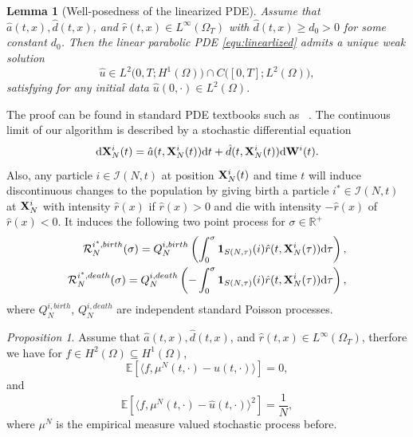 \documentclass[preprint,12pt]{elsarticle}
\newtheorem{lemma}[theorem]{Lemma}
\theoremstyle{definition}
\theoremstyle{remark}
\newtheorem{proposition}{Proposition}
\begin{document}
\begin{lemma}[Well-posedness of the linearized PDE]\label{lemma:well_posedness}
Assume that $\hat a(t,x), \hat d(t,x)$,  and  $ \hat r(t,x) \in L^\infty(\Omega_T)$ with 
$\hat d(t,x) \ge d_0 > 0$ for some constant $d_0$. 
Then the linear parabolic PDE \eqref{equ:linearlized}
admits a unique weak solution 
\[
\hat u \in L^2\big(0,T; H^1(\Omega)\big) \cap C\big([0,T]; L^2(\Omega)\big),
\]
satisfying 
for any initial data $\hat u(0,\cdot) \in L^2(\Omega)$.
\end{lemma}
The proof can be found in standard PDE textbooks such as ~\cite{evans2022partial}.
The continuous limit of our algorithm is described by a stochastic differential equation
\[
\mathrm{d} \mathbf{X}^i_N(t) = \hat a(t,\mathbf{X}^i_N(t))\mathrm{d} t  + \hat d (t,\mathbf{X}^i_N(t)) \mathrm{d} \mathbf{W}^i(t).
\]
Also, any particle $i\in \mathcal I(N,t)$ at position $\mathbf{X}^i_N(t)$ and time $t$ will induce discontinuous changes to the population by giving birth a particle $i^*\in \mathcal I(N,t)$ at $\mathbf{X}^i_N$ with intensity $\hat r(x)$ if $\hat r(x)>0$ and die with intensity $-\hat r(x)$ of $\hat r(x)<0$. It induces the following two point process for $\sigma\in \mathbb R^+$ 
\[
\begin{aligned}
   \mathcal R^{i^*,birth}_N( \sigma) = Q^{i,birth}_N \left(\int_{0}^{ \sigma} \mathbf 1 _{S(N,\tau)}(i)\hat r(t,\mathbf{X}^i_N(\tau))\mathrm{d} \tau\right),\\
    \mathcal R^{i^*,death}_N( \sigma) = Q^{i,death}_N \left(-\int_{0}^{\sigma} \mathbf 1 _{S(N,\tau)}(i)\hat r(t,\mathbf{X}^i_N(\tau))\mathrm{d} \tau\right), 
\end{aligned}
\]
where $Q^{i,birth}_N$, $Q^{i,death}_N$ are independent standard Poisson processes. 
\begin{proposition}
    Assume that $\hat a(t,x), \hat d(t,x)$,  and  $ \hat r(t,x) \in L^\infty(\Omega_T)$, therfore we have for $f \in H^2(\Omega) \subseteq H^1(\Omega)$,
    \[
    \mathbb E \left[ \langle f,\mu^N(t,\cdot)-\hat u(t,\cdot) \rangle \right] = 0,
    \] and 
    \[
    \mathbb E \left[ \langle f,\mu^N(t,\cdot)-\hat u(t,\cdot) \rangle^2 \right] = \frac{1}{N},
    \]
    where $\mu^N$ is the empirical measure valued stochastic process before.
\end{proposition}
\end{document}
